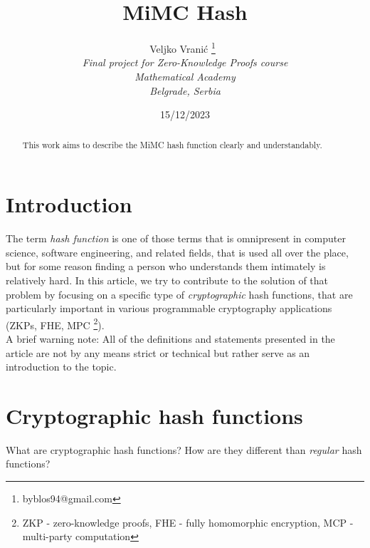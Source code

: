 \documentclass[letterpaper, bothsides, 12pt]{article} %
\title{ \Huge \bf MiMC Hash}
\author{Veljko Vrani\'c \footnote{byblos94@gmail.com}~ \\ {\it Final project for Zero-Knowledge Proofs course} \\ {\it Mathematical Academy} \\ {\it Belgrade, Serbia}}
\date{15/12/2023}
\begin{document}
\maketitle

\hrulefill


\begin{abstract}
This work aims to describe the MiMC hash function clearly and understandably.
\end{abstract}







\section{Introduction}
The term \textit{hash function} is one of those terms that is omnipresent in computer science, software engineering, and related fields, that is used all over the place, but for some reason finding a person who understands them intimately is relatively hard.
In this article, we try to contribute to the solution of that problem by focusing on a specific type of \textit{cryptographic} hash functions, that are particularly important in various programmable cryptography applications (ZKPs, FHE, MPC \footnote{ZKP - zero-knowledge proofs, FHE - fully homomorphic encryption, MCP - multi-party computation}).
\\

A brief warning note: All of the definitions and statements presented in the article are not by any means strict or technical but rather serve as an introduction to the topic. 

\section{Cryptographic hash functions}

What are cryptographic hash functions? How are they different than \textit{regular} hash functions?
\end{document}

